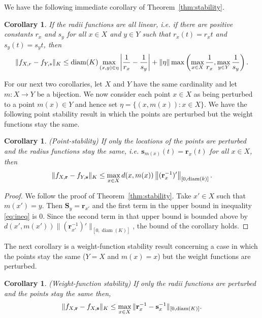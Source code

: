 \documentclass{amsart}
\newtheorem*{fibering lemma}{Fibering Lemma}
\newtheorem*{decomposition lemma}{Decomposition Lemma}
\newtheorem*{hurewicz theorem}{Hurewicz Theorem}
\newtheorem{corollary}[theorem]{Corollary}
\theoremstyle{definition}
\DeclareMathOperator{\diam}{diam}
\begin{document}
We have the following immediate corollary of Theorem~\ref{thm:stability}.

\begin{corollary}
If the radii functions are all linear, i.e. if there are positive constants $r_{x}$ and $s_{y}$ for all $x \in X$ and $y \in Y$ such that $r_{x}(t) = r_{x} t$ and $s_{y}(t) = s_{y} t$, then \[\|f_{X,r}-f_{Y,s}\|_K\le \diam(K) \max_{(x,y) \in \eta} \left|\frac{1}{r_{x}}- \frac{1}{s_{y}}\right|+ \|\eta\| \max\left( \max_{x \in X} \frac{1}{r_{x}} , \max_{y \in Y} \frac{1}{s_{y}}\right)\hbox{.}\]


\end{corollary}

For our next two corollaries, let $X$ and $Y$ have the same cardinality and let $m : X \to Y$ be a bijection.  We now consider each point $x \in X$ as being perturbed to a point $m(x) \in Y$ and hence set $\eta = \{ (x,m(x)) : x \in X\}$. We have the following point stability result in which the points are perturbed but the weight functions stay the same.  

\begin{corollary}(Point-stability)
If only the locations of the points are perturbed and the radius functions stay the same, i.e. $\mathbf{s}_{m(x)}(t) = \mathbf{r}_{x}(t)$ for all $x \in X$, then
\[\|f_{X,\mathbf{r}}-f_{Y,\mathbf{s}}\|_K\le \max_{x \in X} d(x,m(x)) \left\|(\mathbf{r}^{-1}_{x})'\right\|_{[0,\diam(k)]}\hbox{.}\]
\end{corollary}

\begin{proof}
We follow the proof of Theorem~\ref{thm:stability}.  Take $x' \in X$ such that $m(x')=y$.  Then $\mathbf{S}_y = \mathbf{r}_{x'}$ and the first term in the upper bound in inequality \eqref{eq:ineq} is $0$.  Since the second term in that upper bound is bounded above by $d(x',m(x')) \|(\mathbf{r}_{x'}^{-1})'\|_{[0,\diam(K)]}$, the bound of the corollary holds.
\end{proof}

The next corollary is a weight-function stability result concerning a case in which the points stay the same ($Y = X$ and $m(x)=x$) but the weight functions are perturbed.
\begin{corollary}(Weight-function stability)
If only the radii functions are perturbed and the points stay the same then, 
\[\|f_{X,\mathbf{r}}-f_{X,\mathbf{s}}\|_K\le \max_{x \in X} \|\mathbf{r}_{x}^{-1}-\mathbf{s}_{x}^{-1}\|_{[0,\diam(K)]}\hbox{.}\]
\end{corollary}
\end{document}

